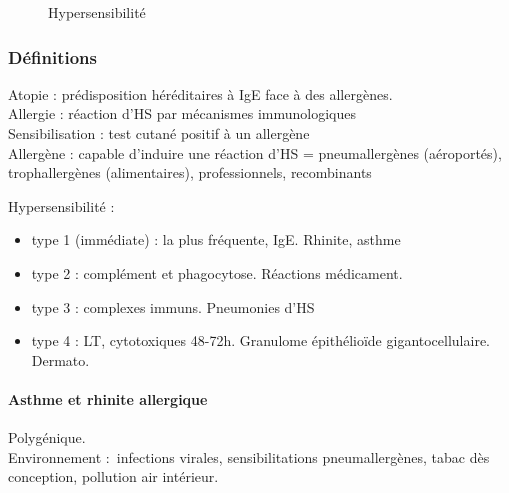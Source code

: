\documentclass[11pt]{article}
\begin{document}
\begin{figure}[htpb]
  \centering
  \caption{Hypersensibilité}
\end{figure}
\subsubsection{Définitions}
\label{sec:org136ee71}
Atopie : prédisposition héréditaires à IgE face à des allergènes.\\
Allergie : réaction d'HS par mécanismes immunologiques\\
Sensibilisation : test cutané positif à un allergène\\
Allergène : capable d'induire une réaction d'HS = pneumallergènes (aéroportés),
trophallergènes (alimentaires), professionnels, recombinants

Hypersensibilité :

\begin{itemize}
\item type 1 (immédiate) : la plus fréquente, IgE. Rhinite, asthme
\item type 2 : complément et phagocytose. Réactions médicament.
\item type 3 : complexes immuns. Pneumonies d'HS
\item type 4 : LT, cytotoxiques 48-72h. Granulome épithélioïde gigantocellulaire.
Dermato.
\end{itemize}


\paragraph{Asthme et rhinite allergique}
\label{sec:orgca8d56d}
Polygénique.\\
Environnement : infections virales, sensibilitations pneumallergènes, tabac dès
conception, pollution air intérieur. 
\end{document}
